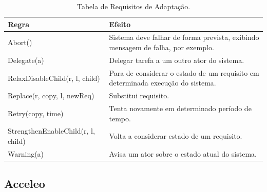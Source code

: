 \begin{table}
	\centering
	\caption{Tabela de Requisitos de Adaptação.}
	\label{awreqs-zanshin}
	\begin{tabularx}{\textwidth}{|l|X|}
		\hline
		\textbf{Regra}                              & \textbf{Efeito}                                                                          \\ \hline
		Abort()                            & Sistema deve falhar de forma prevista, exibindo mensagem de falha, por exemplo. \\ \hline
		Delegate(a)                        & Delegar tarefa a um outro ator do sistema.                                      \\ \hline
		RelaxDisableChild(r, l, child)     & Para de considerar o estado de um requisito em determinada execução do sistema. \\ \hline
		Replace(r, copy, l, newReq)        & Substitui requisito.                                                            \\ \hline
		Retry(copy, time)                  & Tenta novamente em determinado período de tempo.                                \\ \hline
		StrengthenEnableChild(r, l, child) & Volta a considerar estado de um requisito.                                      \\ \hline
		Warning(a)                         & Avisa um ator sobre o estado atual do sistema.                                  \\ \hline
	\end{tabularx}
\end{table}



\subsection{Acceleo}

